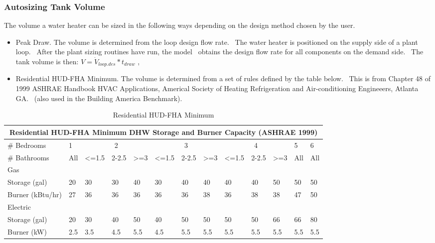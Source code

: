 \subsubsection{Autosizing Tank Volume}\label{autosizing-tank-volume}

The volume a water heater can be sized in the following ways depending on the design method chosen by the user.

\begin{itemize}
  \item Peak Draw. The volume is determined from the loop design flow rate.~ The water heater is positioned on the supply side of a plant loop.~ After the plant sizing routines have run, the model~ obtains the design flow rate for all components on the demand side.~ The tank volume is then: \(V = {\dot V_{loop.des}}*{t_{draw}}\) ,

  \item Residential HUD-FHA Minimum. The volume is determined from a set of rules defined by the table below.~ This is from Chapter 48 of 1999 ASHRAE Handbook HVAC Applications, Americal Society of Heating Refrigeration and Air-conditioning Engineeers, Atlanta GA.~ (also used in the Building America Benchmark).
\end{itemize}

\begin{longtable}[c]{p{0.8in}p{0.35in}p{0.35in}p{0.35in}p{0.35in}p{0.35in}p{0.35in}p{0.35in}p{0.35in}p{0.35in}p{0.35in}p{0.35in}p{0.35in}}
\caption{Residential HUD-FHA Minimum \protect \label{table:residential-hud-fha-minimum}}\\
\toprule 
\multicolumn{13}{c}{Residential HUD-FHA Minimum DHW Storage and Burner Capacity (ASHRAE 1999)} \tabularnewline \midrule
\endhead
\# Bedrooms & 1 & \multicolumn{3}{c}{2} & \multicolumn{3}{c}{3} & \multicolumn{3}{c}{4} & 5 & 6 \tabularnewline
\# Bathrooms & All & <=1.5 & 2-2.5 & >=3 & <=1.5 & 2-2.5 & >=3 & <=1.5 & 2-2.5 & >=3 & All & All \tabularnewline
Gas &  &  &  &  &  &  &  &  &  &  &  &  \tabularnewline
\;\;Storage (gal) & 20 & 30 & 30 & 40 & 30 & 40 & 40 & 40 & 40 & 50 & 50 & 50 \tabularnewline
\;\;Burner (kBtu/hr) & 27 & 36 & 36 & 36 & 36 & 36 & 38 & 36 & 38 & 38 & 47 & 50 \tabularnewline
Electric &  &  &  &  &  &  &  &  &  &  &  &  \tabularnewline
\;\;Storage (gal) & 20 & 30 & 40 & 50 & 40 & 50 & 50 & 50 & 50 & 66 & 66 & 80 \tabularnewline
\;\;Burner (kW) & 2.5 & 3.5 & 4.5 & 5.5 & 4.5 & 5.5 & 5.5 & 5.5 & 5.5 & 5.5 & 5.5 & 5.5 \tabularnewline
\bottomrule
\end{longtable}

